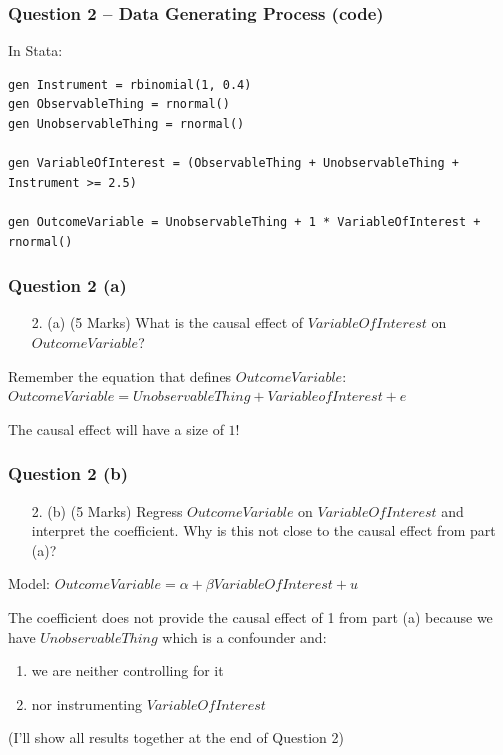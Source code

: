 \documentclass[xcolor=table,dvipsnames]{beamer}
\begin{document}
\begin{frame}[fragile]
\frametitle{Question 2 -- Data Generating Process (code)}
In Stata:
\begin{lstlisting}
gen Instrument = rbinomial(1, 0.4)
gen ObservableThing = rnormal()
gen UnobservableThing = rnormal()

gen VariableOfInterest = (ObservableThing + UnobservableThing + Instrument >= 2.5)

gen OutcomeVariable = UnobservableThing + 1 * VariableOfInterest + rnormal()
\end{lstlisting}
\end{frame}

\begin{frame}
\frametitle{Question 2 (a)}
\begin{enumerate}
\item[2.](a) (5 Marks) What is the causal effect of $VariableOfInterest$ on $OutcomeVariable$?
\end{enumerate} \pause

Remember the equation that defines $OutcomeVariable$: $OutcomeVariable = UnobservableThing + VariableofInterest + e$ \pause 

The causal effect will have a size of $1$!
\end{frame}

\begin{frame}
\frametitle{Question 2 (b)}
\begin{enumerate}
\item[2.] (b) (5 Marks) Regress $OutcomeVariable$ on $VariableOfInterest$ and interpret the coefficient. Why is this not close to the causal effect from part (a)?
\end{enumerate} \pause

Model: \pause $OutcomeVariable = \alpha + \beta VariableOfInterest + u$ \pause

The coefficient does not provide the causal effect of 1 from part (a) because we have $UnobservableThing$ which is a confounder and: \pause 
\begin{enumerate}
\item we are neither controlling for it \pause
\item nor instrumenting $VariableOfInterest$
\end{enumerate} \pause
(I'll show all results together at the end of Question 2)
\end{frame}
\end{document}
